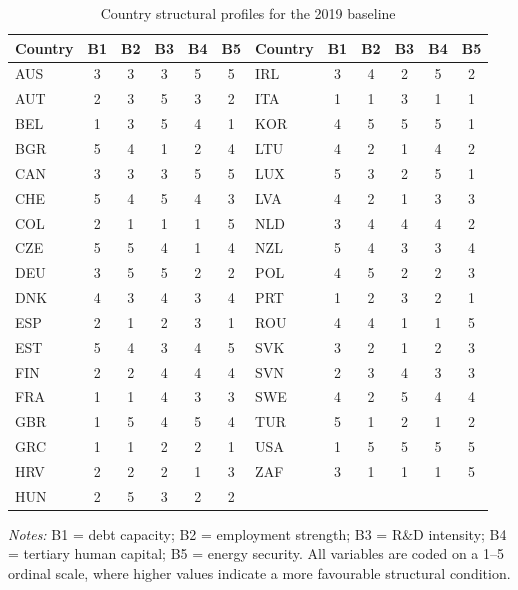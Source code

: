 
\begin{table}[ht]
\centering
\caption{Country structural profiles for the 2019 baseline}
\label{tab:country_profiles_2019}
\scriptsize
\renewcommand{\arraystretch}{1.12}
\setlength{\tabcolsep}{4pt}
\begin{tabular}{lccccc lccccc}
\toprule
\textbf{Country} & \textbf{B1} & \textbf{B2} & \textbf{B3} & \textbf{B4} & \textbf{B5}
& \textbf{Country} & \textbf{B1} & \textbf{B2} & \textbf{B3} & \textbf{B4} & \textbf{B5} \\
\midrule
AUS & 3 & 3 & 3 & 5 & 5 & IRL & 3 & 4 & 2 & 5 & 2 \\
AUT & 2 & 3 & 5 & 3 & 2 & ITA & 1 & 1 & 3 & 1 & 1 \\
BEL & 1 & 3 & 5 & 4 & 1 & KOR & 4 & 5 & 5 & 5 & 1 \\
BGR & 5 & 4 & 1 & 2 & 4 & LTU & 4 & 2 & 1 & 4 & 2 \\
CAN & 3 & 3 & 3 & 5 & 5 & LUX & 5 & 3 & 2 & 5 & 1 \\
CHE & 5 & 4 & 5 & 4 & 3 & LVA & 4 & 2 & 1 & 3 & 3 \\
COL & 2 & 1 & 1 & 1 & 5 & NLD & 3 & 4 & 4 & 4 & 2 \\
CZE & 5 & 5 & 4 & 1 & 4 & NZL & 5 & 4 & 3 & 3 & 4 \\
DEU & 3 & 5 & 5 & 2 & 2 & POL & 4 & 5 & 2 & 2 & 3 \\
DNK & 4 & 3 & 4 & 3 & 4 & PRT & 1 & 2 & 3 & 2 & 1 \\
ESP & 2 & 1 & 2 & 3 & 1 & ROU & 4 & 4 & 1 & 1 & 5 \\
EST & 5 & 4 & 3 & 4 & 5 & SVK & 3 & 2 & 1 & 2 & 3 \\
FIN & 2 & 2 & 4 & 4 & 4 & SVN & 2 & 3 & 4 & 3 & 3 \\
FRA & 1 & 1 & 4 & 3 & 3 & SWE & 4 & 2 & 5 & 4 & 4 \\
GBR & 1 & 5 & 4 & 5 & 4 & TUR & 5 & 1 & 2 & 1 & 2 \\
GRC & 1 & 1 & 2 & 2 & 1 & USA & 1 & 5 & 5 & 5 & 5 \\
HRV & 2 & 2 & 2 & 1 & 3 & ZAF & 3 & 1 & 1 & 1 & 5 \\
HUN & 2 & 5 & 3 & 2 & 2 &  &  &  &  &  &  \\
\bottomrule
\end{tabular}
\vspace{2pt}
\begin{flushleft}
\scriptsize \textit{Notes:} B1 = debt capacity; B2 = employment strength; B3 = R\&D intensity; B4 = tertiary human capital; B5 = energy security. All variables are coded on a 1--5 ordinal scale, where higher values indicate a more favourable structural condition.
\end{flushleft}
\end{table}
